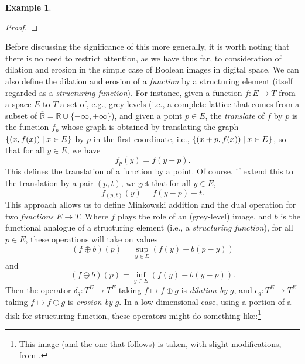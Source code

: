 \documentclass[a4paper]{book}
\theoremstyle{definition}
\newtheorem{example}{Example}[section]
\theoremstyle{definition}
\theoremstyle{definition}
\theoremstyle{theorem}
\theoremstyle{definition}
\begin{document}
\begin{example}
\begin{proof}
	\end{proof}
	Before discussing the significance of this more generally, it is worth noting that there is no need to restrict attention, as we have thus far, to consideration of dilation and erosion in the simple case of Boolean images in digital space. We can also define the dilation and erosion of a \textit{function} by a structuring element (itself regarded as a \textit{structuring function}). For instance, given a function $f: E \rightarrow T$ from a space $E$ to $T$ a set of, e.g., grey-levels (i.e., a complete lattice that comes from a subset of $\overline{\mathbb{R}} = \mathbb{R} \cup \{-\infty, +\infty\}$), and given a point $p \in E$, the \textit{translate} of $f$ by $p$ is the function $f_p$ whose graph is obtained by translating the graph $\{(x, f(x)) \hspace*{0.25em}| \hspace*{0.25em} x \in E\}$ by $p$ in the first coordinate, i.e., $\{(x+p, f(x)) \hspace*{0.25em}| \hspace*{0.25em} x \in E\}$, so that for all $y \in E$, we have 
\begin{equation}
f_p(y) = f(y-p). 
\end{equation}
This defines the translation of a function by a point. Of course, if extend this to the translation by a pair $(p, t)$, we get that for all $y \in E$, 
\begin{equation}
f_{(p,t)}(y) = f(y-p) + t.
\end{equation}
This approach allows us to define Minkowski addition and the dual operation for two \textit{functions} $E \rightarrow T$. Where $f$ plays the role of an (grey-level) image, and $b$ is the functional analogue of a structuring element (i.e., a \textit{structuring function}), for all $p \in E$, these operations will take on values 
\begin{equation}
(f \oplus b)(p)  = \sup_{y \in E} (f(y) + b(p-y)) 
\end{equation}
and 
\begin{equation}
(f \ominus b)(p) = \inf_{y \in E} (f(y) - b(y-p)).
\end{equation}
Then the operator $\delta_g: T^E \rightarrow T^E$ taking $f \mapsto f \oplus g$ is \textit{dilation by}  $g$, and $\epsilon_g: T^E \rightarrow T^E$ taking $f \mapsto f \ominus g$ is \textit{erosion by}  $g$. In a low-dimensional case, using a portion of a disk for structuring function, these operators might do something like:\footnote{This image (and the one that follows) is taken, with slight modifications, from \cite{hlavac_grayscale_nodate}.} 

\end{example}
\end{document}
